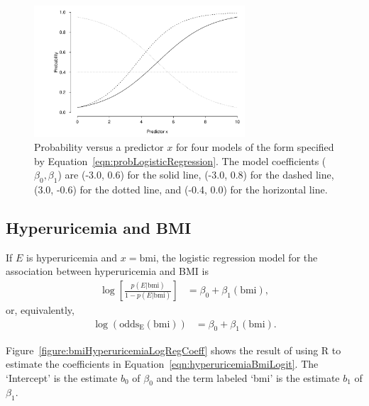 
\begin{figure}[!htb]
	\centering
	\includegraphics[width=0.70\textwidth]
	{ch_logistic_regression_oi_biostat/figures/probVsPredictor/probVsPredictor.pdf}
    \caption{Probability versus a predictor $x$ for four models of the form specified by Equation~\ref{eqn:probLogisticRegression}. The model coefficients ($\beta_0, \beta_1$) are (-3.0, 0.6) for the solid line, (-3.0, 0.8) for the dashed line, (3.0, -0.6) for the dotted line, and (-0.4, 0.0) for the horizontal line.}
    \label{figure:probVsPredictor}
\end{figure}


\subsection{Hyperuricemia and BMI}
\label{section:analyzingHyperuricemia}

If $E$ is hyperuricemia and $x = \text{bmi}$, the logistic regression model for the association between hyperuricemia and BMI is
\begin{align*}
  \log\left[\frac{p(E|\text{bmi})}{1-p(E|\text{bmi})}\right] &=  \beta_0 + \beta_1 (\text{bmi}),
\end{align*}
or, equivalently,
\begin{align}
  \log(\text{odds}_\text{E}(\text{bmi})) &=  \beta_0 + \beta_1 (\text{bmi}).
   \label{eqn:hyperuricemiaBmiLogit}
\end{align}

Figure~\ref{figure:bmiHyperuricemiaLogRegCoeff} shows the result of using \textsf{R} to estimate the coefficients in Equation~\ref{eqn:hyperuricemiaBmiLogit}.  The `Intercept' is the estimate $b_0$  of $\beta_0$ and the term labeled `bmi' is the estimate $b_1$ of $\beta_1$.

